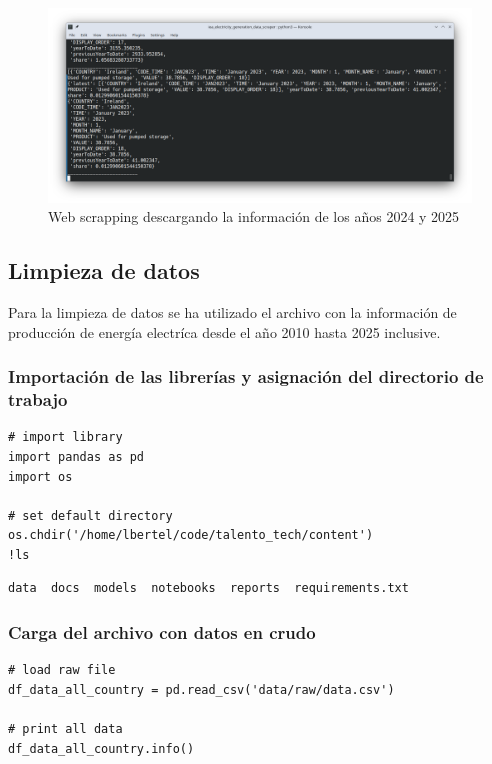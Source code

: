 \documentclass{article}
\begin{document}
\begin{figure}
	\centering
	\includegraphics[width=0.9\linewidth]{scapping_1}
	\caption[Web scrapping]{Web scrapping descargando la informaci\'on de los a\~nos 2024 y 2025}
	\label{fig:scapping1}
\end{figure}


\subsection{Limpieza de datos}

Para la limpieza de datos se ha utilizado el archivo con la informaci\'on de producci\'on de energ\'ia electr\'ica desde el a\~no 2010 hasta 2025 inclusive. 

\subsubsection{Importaci\'on de las librer\'ias y asignaci\'on del directorio de trabajo}

\begin{verbatim}
# import library
import pandas as pd
import os

# set default directory
os.chdir('/home/lbertel/code/talento_tech/content')
!ls
\end{verbatim}

\begin{verbatim}
data  docs  models  notebooks  reports	requirements.txt
\end{verbatim}

\subsubsection{Carga del archivo con datos en crudo}

\begin{verbatim}
# load raw file
df_data_all_country = pd.read_csv('data/raw/data.csv')

# print all data
df_data_all_country.info()
\end{verbatim}
\end{document}
